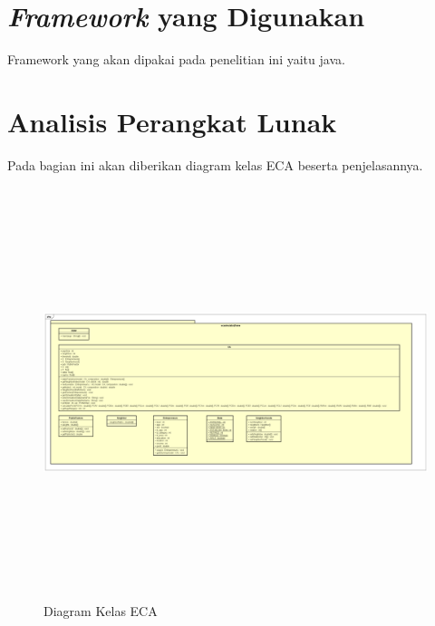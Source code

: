 \section{\textit{Framework} yang Digunakan}
\label{framework}
Framework yang akan dipakai pada penelitian ini yaitu java.
	
	
\section{Analisis Perangkat Lunak}
\label{analisisPL}
Pada bagian ini akan diberikan diagram kelas ECA beserta penjelasannya.

	\begin{figure} [H]
		\centering  
		\includegraphics[width=18cm, height=12cm]{ClassDiagram1} 
		\caption[Diagram Kelas ECA]{Diagram Kelas ECA} 
		\label{fig:CD1} 
	\end{figure}
	

